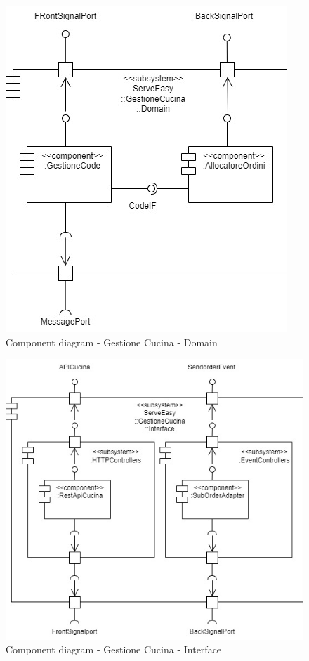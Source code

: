 \begin{figure}[htbp]
	\centering
	\includegraphics[scale=0.5]{iterazione1/images/component_comanda_cucina-GestioneCucina__Domain.jpg}
	\caption{Component diagram - Gestione Cucina - Domain \label{fig:component_diagram_gestione_cucina_domain}}
\end{figure}

\begin{figure}[htbp]
	\centering
	\includegraphics[scale=0.5]{iterazione1/images/component_comanda_cucina-GestioneCucina__Interface.jpg}
	\caption{Component diagram - Gestione Cucina - Interface \label{fig:component_diagram_gestione_cucina_interface}}
\end{figure}

